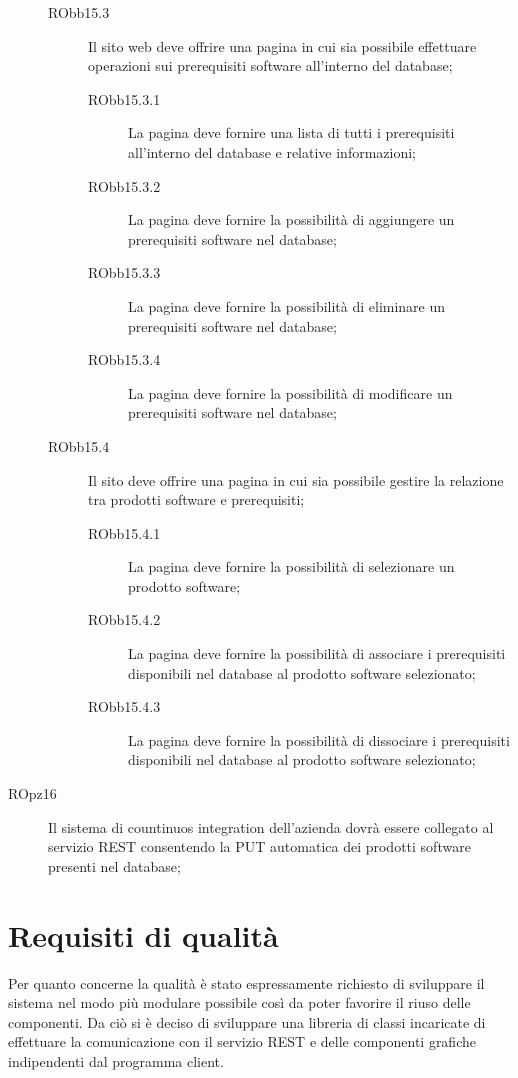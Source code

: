 \documentclass[../RelazioneFinale]{subfiles}
\begin{document}
\begin{description}
\begin{description}
					\item[RObb15.3] Il sito web deve offrire una pagina in cui sia possibile effettuare operazioni sui prerequisiti software all'interno del database;
					\begin{description}
						\item[RObb15.3.1] La pagina deve fornire una lista di tutti i prerequisiti all'interno del database e relative informazioni;
						\item[RObb15.3.2] La pagina deve fornire la possibilità di aggiungere un prerequisiti software nel database;
						\item[RObb15.3.3] La pagina deve fornire la possibilità di eliminare un prerequisiti software nel database;
						\item[RObb15.3.4] La pagina deve fornire la possibilità di modificare un prerequisiti software nel database;
					\end{description}	
					
					\item[RObb15.4] Il sito deve offrire una pagina in cui sia possibile gestire la relazione tra prodotti software e prerequisiti;
					\begin{description}
						\item[RObb15.4.1] La pagina deve fornire la possibilità di selezionare un prodotto software;
						\item[RObb15.4.2] La pagina deve fornire la possibilità di associare i prerequisiti disponibili nel database al prodotto software selezionato;
						\item[RObb15.4.3] La pagina deve fornire la possibilità di dissociare i prerequisiti disponibili nel database al prodotto software selezionato;
					\end{description}								
					
				\end{description}								
				
				\item[ROpz16] Il sistema di countinuos integration dell'azienda dovrà essere collegato al servizio REST consentendo la PUT automatica dei prodotti software presenti nel database;				
				
			\end{description}
		
		
		\section{Requisiti di qualità}
			Per quanto concerne la qualità è stato espressamente richiesto di sviluppare il sistema nel modo più modulare possibile così da poter favorire il riuso delle componenti. Da ciò si è deciso di sviluppare una libreria di classi incaricate di effettuare la comunicazione con il servizio REST e delle componenti grafiche indipendenti dal programma client.
			
\end{document}
